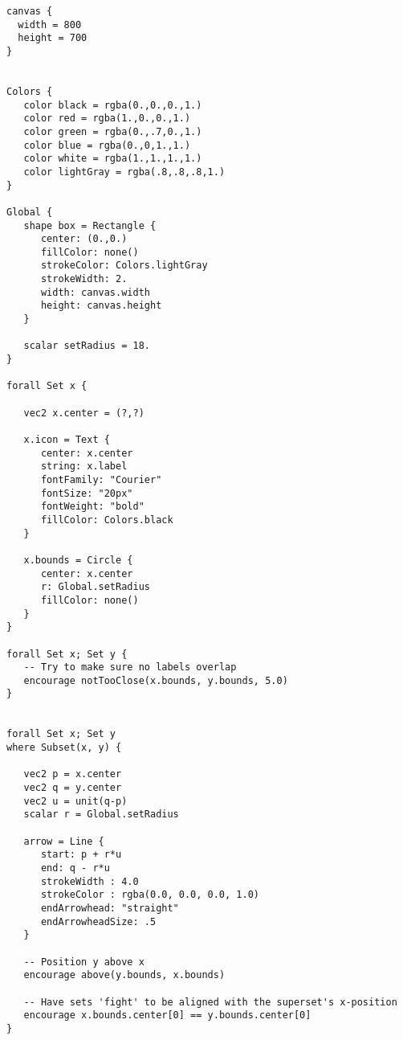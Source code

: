 \begin{center}
\begin{mdframed}[style=STYCode]
\begin{lstlisting}[language=Sty-Sets-new,escapechar=@]
canvas {
  width = 800
  height = 700
}


Colors {
   color black = rgba(0.,0.,0.,1.)
   color red = rgba(1.,0.,0.,1.)
   color green = rgba(0.,.7,0.,1.)
   color blue = rgba(0.,0,1.,1.)
   color white = rgba(1.,1.,1.,1.)
   color lightGray = rgba(.8,.8,.8,1.)
}

Global {
   shape box = Rectangle {
      center: (0.,0.)
      fillColor: none()
      strokeColor: Colors.lightGray
      strokeWidth: 2.
      width: canvas.width
      height: canvas.height
   }

   scalar setRadius = 18.
}

forall Set x {

   vec2 x.center = (?,?)

   x.icon = Text {
      center: x.center
      string: x.label
      fontFamily: "Courier"
      fontSize: "20px"
      fontWeight: "bold"
      fillColor: Colors.black
   }

   x.bounds = Circle {
      center: x.center
      r: Global.setRadius
      fillColor: none()
   }
}

forall Set x; Set y {
   -- Try to make sure no labels overlap
   encourage notTooClose(x.bounds, y.bounds, 5.0)
}


forall Set x; Set y
where Subset(x, y) {

   vec2 p = x.center
   vec2 q = y.center
   vec2 u = unit(q-p)
   scalar r = Global.setRadius

   arrow = Line {
      start: p + r*u
      end: q - r*u
      strokeWidth : 4.0
      strokeColor : rgba(0.0, 0.0, 0.0, 1.0)
      endArrowhead: "straight"
      endArrowheadSize: .5
   }

   -- Position y above x
   encourage above(y.bounds, x.bounds)

   -- Have sets 'fight' to be aligned with the superset's x-position
   encourage x.bounds.center[0] == y.bounds.center[0]
}
\end{lstlisting}
\end{mdframed}
\end{center}